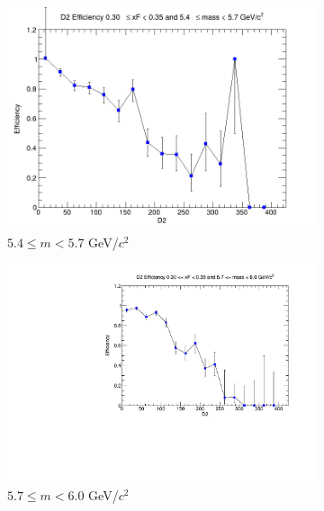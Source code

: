 \begin{figure}[p]
\begin{subfigure}[b]{0.32\textwidth}
        \includegraphics[width=\textwidth]{./kTrackerEfficiencyPlots/D2_Efficiency_xF6_mass4.png}
        \caption{$5.4 \leq m < 5.7$ GeV/$c^2$}
        \label{fig:xF6_mass4}
    \end{subfigure}
    \hfill
    \begin{subfigure}[b]{0.32\textwidth}
        \centering
        \includegraphics[width=\textwidth]{./kTrackerEfficiencyPlots/D2_Efficiency_xF6_mass5.pdf}
        \caption{$5.7 \leq m < 6.0$ GeV/$c^2$}
        \label{fig:xF6_mass5}
    \end{subfigure}
    \vspace{0.5cm}
    \begin{subfigure}[b]{0.32\textwidth}
        \centering

\end{subfigure}
\end{figure}
